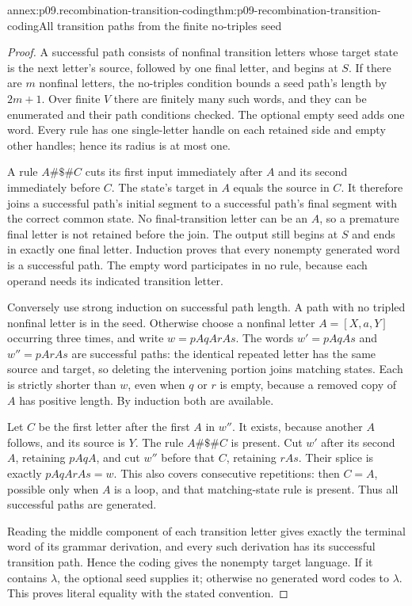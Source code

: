 \begin{annexitem}{annex:p09.recombination-transition-coding}{thm:p09-recombination-transition-coding}{All transition paths from the finite no-triples seed}
\begin{proof}
A successful path consists of nonfinal transition letters whose target
state is the next letter's source, followed by one final letter, and begins
at \(S\). If there are \(m\) nonfinal letters, the no-triples condition
bounds a seed path's length by \(2m+1\). Over finite \(V\) there are
finitely many such words, and they can be enumerated and their path
conditions checked. The optional empty seed adds one word.
Every rule has one single-letter handle on each retained side and empty
other handles; hence its radius is at most one.

A rule \(A\#\$\#C\) cuts its first input immediately after \(A\)
and its second immediately before \(C\). The state's target in \(A\)
equals the source in \(C\). It therefore joins a successful path's
initial segment to a successful path's final segment with the correct
common state. No final-transition letter can be an \(A\), so a premature
final letter is not retained before the join. The output still begins at
\(S\) and ends in exactly one final letter. Induction proves that every
nonempty generated word is a successful path. The empty word participates
in no rule, because each operand needs its indicated transition letter.

Conversely use strong induction on successful path length. A path with no
tripled nonfinal letter is in the seed. Otherwise choose a nonfinal letter
\(A=[X,a,Y]\) occurring three times, and write
\(w=pAqArAs\). The words \(w'=pAqAs\) and \(w''=pArAs\) are successful
paths: the identical repeated letter has the same source and target,
so deleting the intervening portion joins matching states. Each is strictly
shorter than \(w\), even when \(q\) or \(r\) is empty, because a removed
copy of \(A\) has positive length. By induction both are available.

Let \(C\) be the first letter after the first \(A\) in \(w''\).
It exists, because another \(A\) follows, and its source is \(Y\).
The rule \(A\#\$\#C\) is present. Cut \(w'\) after its second
\(A\), retaining \(pAqA\), and cut \(w''\) before that \(C\),
retaining \(rAs\). Their splice is exactly \(pAqArAs=w\).
This also covers consecutive repetitions: then \(C=A\), possible only
when \(A\) is a loop, and that matching-state rule is present.
Thus all successful paths are generated.

Reading the middle component of each transition letter gives exactly the
terminal word of its grammar derivation, and every such derivation has its
successful transition path. Hence the coding gives the nonempty target
language. If it contains \(\lambda\), the optional seed supplies it;
otherwise no generated word codes to \(\lambda\). This proves literal
equality with the stated convention.
\end{proof}
\end{annexitem}

